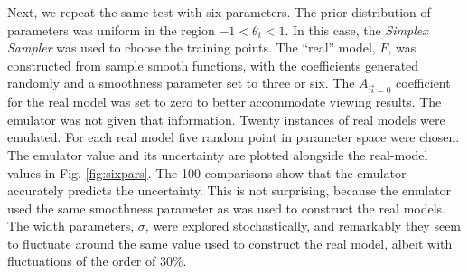 \documentclass[UserManual.tex]{subfiles}
\begin{document}
Next, we repeat the same test with six parameters. The prior distribution of parameters was uniform in the region $-1<\theta_i<1$. In this case, the {\it Simplex Sampler} was used to choose the training points. The ``real'' model, $F$, was constructed from sample smooth functions, with the coefficients generated randomly and a smoothness parameter set to three or six. The $A_{\vec{n}=0}$ coefficient for the real model was set to zero to better accommodate viewing results. The emulator was not given that information. Twenty instances of real models were emulated. For each real model five random point in parameter space were chosen. The emulator value and its uncertainty are plotted alongside the real-model values in Fig. \ref{fig:sixpars}. The 100 comparisons show that the emulator accurately predicts the uncertainty. This is not surprising, because the emulator used the same smoothness parameter as was used to construct the real models. The width parameters, $\sigma$, were explored stochastically, and remarkably they seem to fluctuate around the same value used to construct the real model, albeit with fluctuations of the order of 30\%. 
\end{document}
